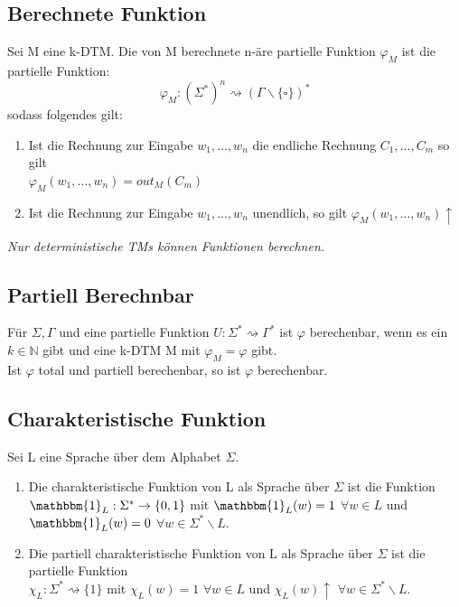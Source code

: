 \documentclass[DIV=15]{scrartcl}
\begin{document}
    \subsection{Berechnete Funktion}
        Sei M eine k-DTM. Die von M berechnete n-äre partielle Funktion \(\varphi_M\) ist die partielle Funktion:
        \[\varphi_M:(\Sigma^*)^n\rightsquigarrow(\Gamma\backslash\{\square\})^*\]
        sodass folgendes gilt:
        \begin{enumerate}
            \item Ist die Rechnung zur Eingabe \(w_1,\dots,w_n\) die endliche Rechnung \(C_1,\dots,C_m\) so gilt\\ 
            \(\varphi_M(w_1,\dots,w_n)=out_M(C_m)\)
            \item Ist die Rechnung zur Eingabe \(w_1,\dots,w_n\) unendlich, so gilt \(\varphi_M(w_1,\dots,w_n)\uparrow\)
        \end{enumerate}\bigskip
        \textit{Nur deterministische TMs können Funktionen berechnen.}
    \subsection{Partiell Berechnbar}
        Für \(\Sigma,\Gamma\) und eine partielle Funktion \(U:\Sigma^*\rightsquigarrow\Gamma^*\) ist \(\varphi\) berechenbar, 
        wenn es ein \(k\in\mathbb{N}\) gibt und eine k-DTM M mit \(\varphi_M=\varphi\) gibt.\\
        Ist \(\varphi\) total und partiell berechenbar, so ist \(\varphi\) berechenbar.
    \subsection{Charakteristische Funktion}
        Sei L eine Sprache über dem Alphabet \(\Sigma\).
        \begin{enumerate}
            \item Die charakteristische Funktion von L als Sprache über \(\Sigma\) ist die Funktion\\
            \(\mathbbm{1}_L:\Sigma^*\to\{0,1\}\) mit \(\mathbbm{1}_L(w)=1\) \(\forall w\in L\) und \(\mathbbm{1}_L(w)=0\) \(\forall w\in\Sigma^*\backslash L\).
            \item Die partiell charakteristische Funktion von L als Sprache über \(\Sigma\) ist die partielle Funktion\\
            \(\chi_L:\Sigma^*\rightsquigarrow\{1\}\) mit \(\chi_L(w)=1\) \(\forall w\in L\) und \(\chi_L(w)\uparrow\) \(\forall w\in\Sigma^*\backslash L\).
        \end{enumerate}
\end{document}
